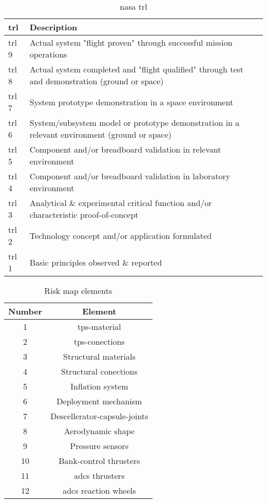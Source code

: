 \begin{table}[h]
	\caption[\acrfull{nasa} ]{\acrfull{nasa} \acrfull{trl} \cite{NASA2007}}
	\begin{tabular}{|p{}|p{}|}
		\hline
		\textbf{\acrfull{trl}} & \textbf{Description} \\ \hline \hline
		\gls{trl} 9& Actual system "flight proven" through successful mission operations\\
		\gls{trl} 8& Actual system completed and "flight qualified" through test and demonstration (ground or space)\\
		\gls{trl} 7& System prototype demonstration in a space environment\\
		\gls{trl} 6& System/subsystem model or prototype demonstration in a relevant environment (ground or space)\\
		\gls{trl} 5& Component and/or breadboard validation in relevant environment\\
		\gls{trl} 4& Component and/or breadboard validation in laboratory environment\\
		\gls{trl} 3& Analytical \& experimental critical function and/or characteristic proof-of-concept\\
		\gls{trl} 2& Technology concept and/or application formulated\\
		\gls{trl} 1& Basic principles observed \& reported \\
		\hline
	\end{tabular}
	\label{tab:trls}
\end{table}

\begin{table}[h]
	\centering
	\caption{Risk map elements}
	\label{tab:riskmapelements}
	\begin{tabular}{|c|c|}
		\hline 
		\textbf{Number} & \textbf{Element} \\ \hline \hline
		1 & \acrlong{tps}-material \\
		2 & \acrlong{tps}-conections\\
		3 & Structural materials\\
		4 & Structural conections\\
		5 & Inflation system	\\	
		6 & Deployment mechanism\\
		7 & Descellerator-capsule-joints\\
		8 & Aerodynamic shape\\
		9 & Pressure sensors\\
		10 & Bank-control thrusters\\
		11 & \gls{adcs} thrusters\\
		12 & \gls{adcs} reaction wheels\\
		\hline
	\end{tabular}
\end{table}

